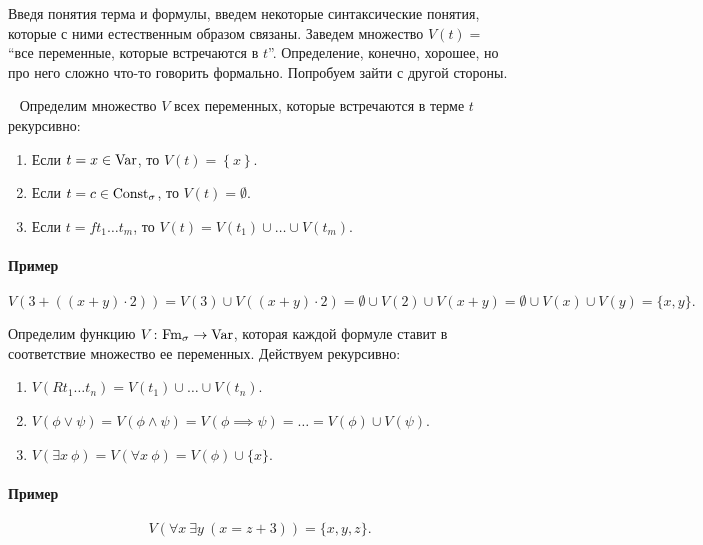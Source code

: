Введя понятия терма и формулы, введем некоторые синтаксические понятия, которые с ними естественным образом связаны.
Заведем множество $V(t) = $ \enquote{все переменные, которые встречаются в $t$}.
Определение, конечно, хорошее, но про него сложно что-то говорить формально.
Попробуем зайти с другой стороны.
\begin{definition}~ \label{def::variables-in-term}
    Определим множество $V$ всех переменных, которые встречаются в терме $t$ рекурсивно:
    \begin{enumerate}
        \item Если $t = x \in \mathrm{Var}$, то $V(t) = \left\{x\right\}$.
        \item Если $t = c \in \mathrm{Const}_{\sigma}$, то $V(t) = \emptyset$.
        \item Если $t = f t_{1} \ldots t_{m}$, то $V(t) = V(t_{1}) \cup \ldots \cup V(t_{m})$.
    \end{enumerate}
\end{definition}

\paragraph{Пример}
$$
    V(3 + ((x + y) \cdot 2)) = V(3) \cup V((x + y) \cdot 2) = \emptyset \cup V(2) \cup V(x + y) = \emptyset \cup V(x) \cup V(y) = \{x, y\}.
$$

\begin{definition}
    Определим функцию $V \colon \mathrm{Fm}_{\sigma} \to \mathrm{Var}$, которая каждой формуле ставит в соответствие множество ее переменных.
    Действуем рекурсивно:
    \begin{enumerate}
        \item $V(R t_{1} \ldots t_{n}) = V(t_{1}) \cup \ldots \cup V(t_{n})$.
        \item $V(\phi \lor \psi) = V(\phi \land \psi) = V(\phi \implies \psi) = \ldots = V(\phi) \cup V(\psi)$.
        \item $V(\exists x~\phi) = V(\forall x~\phi) = V(\phi) \cup \{x\}$.
    \end{enumerate}
\end{definition}

\paragraph{Пример}
$$
    V(\forall x~ \exists y~ (x = z + 3)) = \{x, y, z\}.
$$

